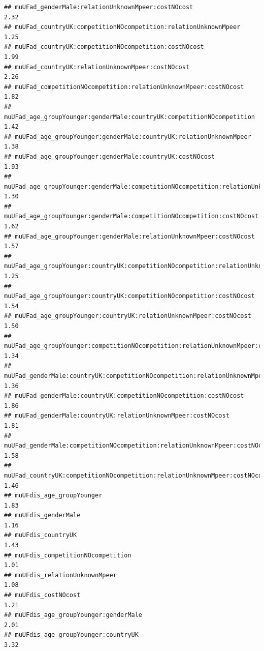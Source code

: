\documentclass[
]{article}
\begin{document}
\begin{verbatim}
## muUFad_genderMale:relationUnknownMpeer:costNOcost                                      2.32
## muUFad_countryUK:competitionNOcompetition:relationUnknownMpeer                         1.25
## muUFad_countryUK:competitionNOcompetition:costNOcost                                   1.99
## muUFad_countryUK:relationUnknownMpeer:costNOcost                                       2.26
## muUFad_competitionNOcompetition:relationUnknownMpeer:costNOcost                        1.82
## muUFad_age_groupYounger:genderMale:countryUK:competitionNOcompetition                  1.42
## muUFad_age_groupYounger:genderMale:countryUK:relationUnknownMpeer                      1.38
## muUFad_age_groupYounger:genderMale:countryUK:costNOcost                                1.93
## muUFad_age_groupYounger:genderMale:competitionNOcompetition:relationUnknownMpeer       1.30
## muUFad_age_groupYounger:genderMale:competitionNOcompetition:costNOcost                 1.62
## muUFad_age_groupYounger:genderMale:relationUnknownMpeer:costNOcost                     1.57
## muUFad_age_groupYounger:countryUK:competitionNOcompetition:relationUnknownMpeer        1.25
## muUFad_age_groupYounger:countryUK:competitionNOcompetition:costNOcost                  1.54
## muUFad_age_groupYounger:countryUK:relationUnknownMpeer:costNOcost                      1.50
## muUFad_age_groupYounger:competitionNOcompetition:relationUnknownMpeer:costNOcost       1.34
## muUFad_genderMale:countryUK:competitionNOcompetition:relationUnknownMpeer              1.36
## muUFad_genderMale:countryUK:competitionNOcompetition:costNOcost                        1.86
## muUFad_genderMale:countryUK:relationUnknownMpeer:costNOcost                            1.81
## muUFad_genderMale:competitionNOcompetition:relationUnknownMpeer:costNOcost             1.58
## muUFad_countryUK:competitionNOcompetition:relationUnknownMpeer:costNOcost              1.46
## muUFdis_age_groupYounger                                                               1.83
## muUFdis_genderMale                                                                     1.16
## muUFdis_countryUK                                                                      1.43
## muUFdis_competitionNOcompetition                                                       1.01
## muUFdis_relationUnknownMpeer                                                           1.08
## muUFdis_costNOcost                                                                     1.21
## muUFdis_age_groupYounger:genderMale                                                    2.01
## muUFdis_age_groupYounger:countryUK                                                     3.32

\end{verbatim}
\end{document}

